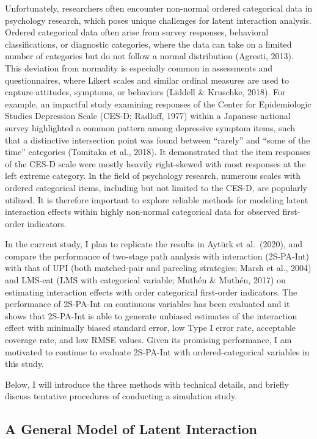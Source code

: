 \documentclass[
  man]{apa7}
\begin{document}
Unfortunately, researchers often encounter non-normal ordered categorical data in psychology research, which poses unique challenges for latent interaction analysis. Ordered categorical data often arise from survey responses, behavioral classifications, or diagnostic categories, where the data can take on a limited number of categories but do not follow a normal distribution (Agresti, 2013). This deviation from normality is especially common in assessments and questionnaires, where Likert scales and similar ordinal measures are used to capture attitudes, symptoms, or behaviors (Liddell \& Kruschke, 2018). For example, an impactful study examining responses of the Center for Epidemiologic Studies Depression Scale (CES-D; Radloff, 1977) within a Japanese national survey highlighted a common pattern among depressive symptom items, such that a distinctive intersection point was found between ``rarely'' and ``some of the time'' categories (Tomitaka et al., 2018). It demonstrated that the item responses of the CES-D scale were mostly heavily right-skewed with most responses at the left extreme category. In the field of psychology research, numerous scales with ordered categorical items, including but not limited to the CES-D, are popularly utilized. It is therefore important to explore reliable methods for modeling latent interaction effects within highly non-normal categorical data for observed first-order indicators.

In the current study, I plan to replicate the results in Aytürk et al.~(2020), and compare the performance of two-stage path analysis with interaction (2S-PA-Int) with that of UPI (both matched-pair and parceling strategies; Marsh et al., 2004) and LMS-cat (LMS with categorical variable; Muthén \& Muthén, 2017) on estimating interaction effects with order categorical first-order indicators. The performance of 2S-PA-Int on continuous variables has been evaluated and it shows that 2S-PA-Int is able to generate unbiased estimates of the interaction effect with minimally biased standard error, low Type I error rate, acceptable coverage rate, and low RMSE values. Given its promising performance, I am motivated to continue to evaluate 2S-PA-Int with ordered-categorical variables in this study.

Below, I will introduce the three methods with technical details, and briefly discuss tentative procedures of conducting a simulation study.

\hypertarget{a-general-model-of-latent-interaction}{%
\subsection{A General Model of Latent Interaction}\label{a-general-model-of-latent-interaction}}
\end{document}
